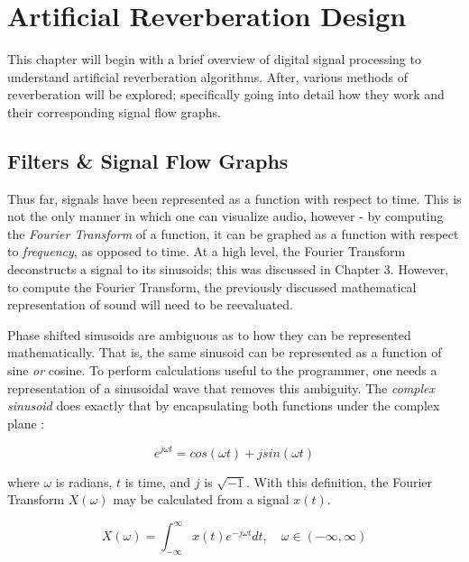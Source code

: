 \chapter{Artificial Reverberation Design}
\hspace*{-0.15cm}This chapter will begin with a brief overview of digital signal processing to understand artificial reverberation algorithms. After, various methods of reverberation will be explored; specifically going into detail how they work and their corresponding signal flow graphs.

\section{Filters \& Signal Flow Graphs}
Thus far, signals have been represented as a function with respect to time. This is not the only manner in which one can visualize audio, however - by computing the \textit{Fourier Transform} of a function, it can be graphed as a function with respect to \textit{frequency}, as opposed to time. At a high level, the Fourier Transform deconstructs a signal to its sinusoids; this was discussed in Chapter 3. However, to compute the Fourier Transform, the previously discussed mathematical representation of sound will need to be reevaluated.

Phase shifted sinusoids are ambiguous as to how they can be represented mathematically. That is, the same sinusoid can be represented as a function of sine \textit{or} cosine. To perform calculations useful to the programmer, one needs a representation of a sinusoidal wave that removes this ambiguity. The \textit{complex sinusoid} does exactly that by encapsulating both functions under the complex plane \cite{pirkle2019designing}:

\begin{defn}\label{def-complex}
	\begin{equation}\label{eq-complex)}
	e^{j\omega t} = cos(\omega t) + j sin(\omega t)
\end{equation}\end{defn}

where $\omega$ is radians, $t$ is time, and $j$ is $ \sqrt{-1}$. With this definition, the Fourier Transform $X(\omega)$ may be calculated from a signal $x(t)$.

\begin{defn}\label{def-Cont-FT}
	\begin{equation}\label{eq-Cont-FT)}
	X(\omega) = \int_{-\infty}^\infty x(t)e^{-j\omega t}dt, \quad \omega \in (-\infty, \infty)
\end{equation}\end{defn}

